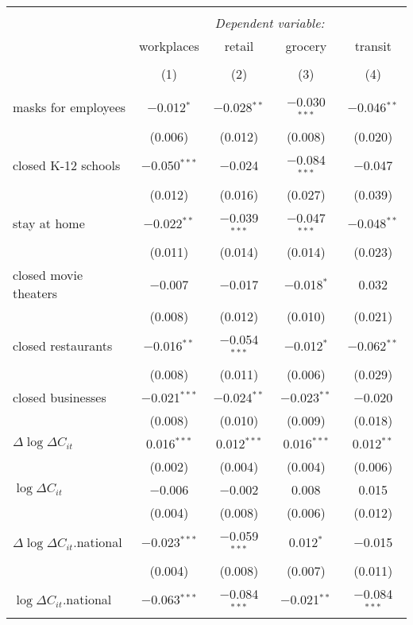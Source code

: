 \begin{tabular}{@{\extracolsep{1pt}}lcccc} 
\\[-1.8ex]\hline 
\hline \\[-1.8ex] 
 & \multicolumn{4}{c}{\textit{Dependent variable:}} \\ 
\cline{2-5} 
 & workplaces & retail & grocery & transit \\ 
\\[-1.8ex] & (1) & (2) & (3) & (4)\\ 
\hline \\[-1.8ex] 
 masks for employees & $-$0.012$^{*}$ & $-$0.028$^{**}$ & $-$0.030$^{***}$ & $-$0.046$^{**}$ \\ 
  & (0.006) & (0.012) & (0.008) & (0.020) \\ 
  closed K-12 schools & $-$0.050$^{***}$ & $-$0.024 & $-$0.084$^{***}$ & $-$0.047 \\ 
  & (0.012) & (0.016) & (0.027) & (0.039) \\ 
  stay at home & $-$0.022$^{**}$ & $-$0.039$^{***}$ & $-$0.047$^{***}$ & $-$0.048$^{**}$ \\ 
  & (0.011) & (0.014) & (0.014) & (0.023) \\ 
  closed movie theaters & $-$0.007 & $-$0.017 & $-$0.018$^{*}$ & 0.032 \\ 
  & (0.008) & (0.012) & (0.010) & (0.021) \\ 
  closed restaurants & $-$0.016$^{**}$ & $-$0.054$^{***}$ & $-$0.012$^{*}$ & $-$0.062$^{**}$ \\ 
  & (0.008) & (0.011) & (0.006) & (0.029) \\ 
  closed businesses & $-$0.021$^{***}$ & $-$0.024$^{**}$ & $-$0.023$^{**}$ & $-$0.020 \\ 
  & (0.008) & (0.010) & (0.009) & (0.018) \\ 
  $\Delta \log \Delta C_{it}$ & 0.016$^{***}$ & 0.012$^{***}$ & 0.016$^{***}$ & 0.012$^{**}$ \\ 
  & (0.002) & (0.004) & (0.004) & (0.006) \\ 
  $\log \Delta C_{it}$ & $-$0.006 & $-$0.002 & 0.008 & 0.015 \\ 
  & (0.004) & (0.008) & (0.006) & (0.012) \\ 
  $\Delta \log \Delta C_{it}$.national & $-$0.023$^{***}$ & $-$0.059$^{***}$ & 0.012$^{*}$ & $-$0.015 \\ 
  & (0.004) & (0.008) & (0.007) & (0.011) \\ 
  $\log \Delta C_{it}$.national & $-$0.063$^{***}$ & $-$0.084$^{***}$ & $-$0.021$^{**}$ & $-$0.084$^{***}$ \\ 

\end{tabular}
